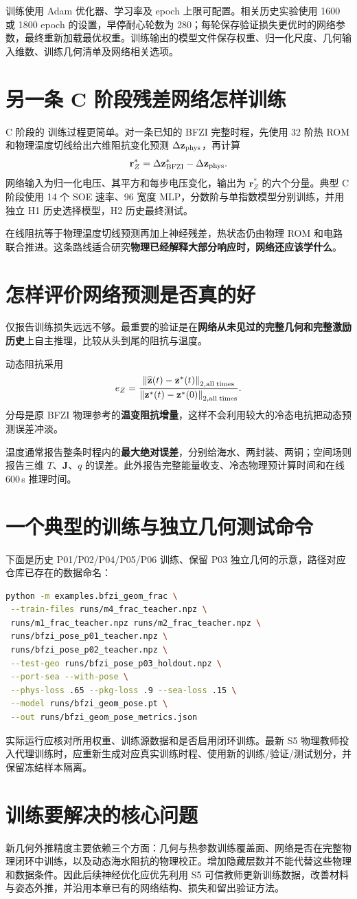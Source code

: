 训练使用 Adam 优化器、学习率及 epoch 上限可配置。相关历史实验使用 1600 或 1800 epoch 的设置，早停耐心轮数为 280；每轮保存验证损失更优时的网络参数，最终重新加载最优权重。训练输出的模型文件保存权重、归一化尺度、几何输入维数、训练几何清单及网络相关选项。

\section{另一条 C 阶段残差网络怎样训练}
C 阶段的  训练过程更简单。对一条已知的 BFZI 完整时程，先使用 32 阶热 ROM 和物理温度切线给出六维阻抗变化预测 $\Delta\mathbf z_{\rm phys}$，再计算
\[
\mathbf r_Z^*=
\Delta\mathbf z_{\rm BFZI}^{*}
-\Delta\mathbf z_{\rm phys}.
\]
网络输入为归一化电压、其平方和每步电压变化，输出为 $\mathbf r_Z^*$ 的六个分量。典型 C 阶段使用 14 个 SOE 速率、96 宽度 MLP，分数阶与单指数模型分别训练，并用独立 H1 历史选择模型，H2 历史最终测试。

在线阻抗等于物理温度切线预测再加上神经残差，热状态仍由物理 ROM 和电路联合推进。这条路线适合研究\textbf{物理已经解释大部分响应时，网络还应该学什么}。

\section{怎样评价网络预测是否真的好}
仅报告训练损失远远不够。最重要的验证是在\textbf{网络从未见过的完整几何和完整激励历史}上自主推理，比较从头到尾的阻抗与温度。

动态阻抗采用
\[
e_Z=
\frac{\left\|
\widehat{\mathbf z}(t)-\mathbf z^*(t)
\right\|_{2,\rm all\;times}}
{\left\|\mathbf z^*(t)-\mathbf z^*(0)\right\|_{2,\rm all\;times}}.
\]
分母是原 BFZI 物理参考的\textbf{温变阻抗增量}，这样不会利用较大的冷态电抗把动态预测误差冲淡。

温度通常报告整条时程内的\textbf{最大绝对误差}，分别给海水、两封装、两铜；空间场则报告三维 $T$、$\mathbf J$、$q$ 的误差。此外报告完整能量收支、冷态物理预计算时间和在线 600\,s 推理时间。

\section{一个典型的训练与独立几何测试命令}
下面是历史 P01/P02/P04/P05/P06 训练、保留 P03 独立几何的示意，路径对应仓库已存在的数据命名：
\begin{lstlisting}[language=bash,caption={40 维几何网络训练入口}]
python -m examples.bfzi_geom_frac \
 --train-files runs/m4_frac_teacher.npz \
 runs/m1_frac_teacher.npz runs/m2_frac_teacher.npz \
 runs/bfzi_pose_p01_teacher.npz \
 runs/bfzi_pose_p02_teacher.npz \
 --test-geo runs/bfzi_pose_p03_holdout.npz \
 --port-sea --with-pose \
 --phys-loss .65 --pkg-loss .9 --sea-loss .15 \
 --model runs/bfzi_geom_pose.pt \
 --out runs/bfzi_geom_pose_metrics.json
\end{lstlisting}
实际运行应核对所用权重、训练源数据和是否启用闭环训练。最新 S5 物理教师投入代理训练时，应重新生成对应真实训练时程、使用新的训练/验证/测试划分，并保留冻结样本隔离。

\section{训练要解决的核心问题}
新几何外推精度主要依赖三个方面：几何与热参数训练覆盖面、网络是否在完整物理闭环中训练，以及动态海水阻抗的物理校正。增加隐藏层数并不能代替这些物理和数据条件。因此后续神经优化应优先利用 S5 可信教师更新训练数据，改善材料与姿态外推，并沿用本章已有的网络结构、损失和留出验证方法。
